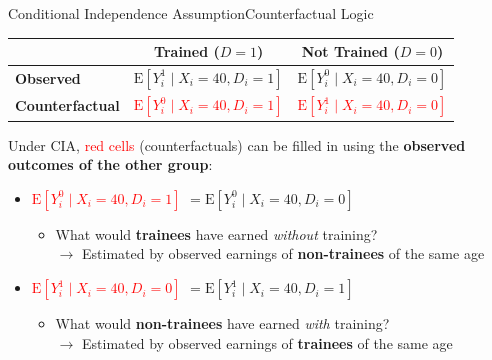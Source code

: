 \documentclass[dvipsnames,hyperref={pdfpagelabels=false}]{beamer}
\begin{document}
\begin{frame}{Conditional Independence Assumption}{Counterfactual Logic}

\begin{center}
\renewcommand{\arraystretch}{1.6}
\begin{tabular}{lcc}
\toprule
 & \textbf{Trained} ($D=1$) & \textbf{Not Trained} ($D=0$) \\
\midrule
\textbf{Observed} &
  $\mathrm{E}[Y^1_i \mid X_i{=}40, D_i{=}1]$ &
  $\mathrm{E}[Y^0_i \mid X_i{=}40, D_i{=}0]$ \\[0.2cm]
\textbf{Counterfactual} &
  \textcolor{red}{$\mathrm{E}[Y^0_i \mid X_i{=}40, D_i{=}1]$} &
  \textcolor{red}{$\mathrm{E}[Y^1_i \mid X_i{=}40, D_i{=}0]$} \\
\bottomrule
\end{tabular}
\end{center}

\vspace{0.2cm}
Under CIA, \textcolor{red}{red cells} (counterfactuals) can be filled in using the \textbf{observed outcomes of the other group}:

\vspace{0.2cm}
\begin{itemize}
    \item \textcolor{red}{$\mathrm{E}[Y^{0}_{i}\mid X_i{=}40, D_i{=}1]$} $= \mathrm{E}[Y^{0}_{i}\mid X_i{=}40, D_i{=}0]$
    \vspace{0.2cm}
    \begin{itemize}
        \item What would \textbf{trainees} have earned \emph{without} training?\\
        $\rightarrow$ Estimated by observed earnings of \textbf{non-trainees} of the same age
    \end{itemize}
    \vspace{0.2cm}
    \item \textcolor{red}{$\mathrm{E}[Y^{1}_{i}\mid X_i{=}40, D_i{=}0]$} $= \mathrm{E}[Y^{1}_{i}\mid X_i{=}40, D_i{=}1]$
    \vspace{0.2cm}
    \begin{itemize}
        \item What would \textbf{non-trainees} have earned \emph{with} training?\\
        $\rightarrow$ Estimated by observed earnings of \textbf{trainees} of the same age
    \end{itemize}
\end{itemize}


\end{frame}
\end{document}
